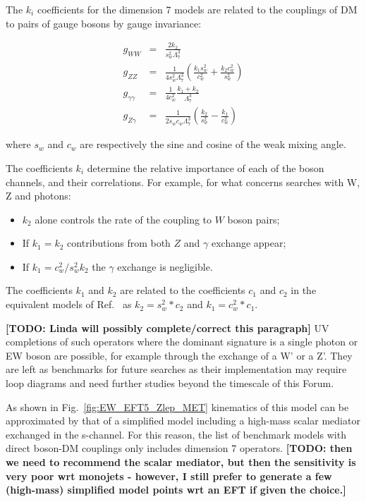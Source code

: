 The $k_i$ coefficients for the dimension 7 models are related to the couplings of DM to pairs of gauge 
bosons by gauge invariance: 

\begin{eqnarray}
g_{WW}&=&\frac{2k_2}{s_w^2 \Lambda_7^3} \\
g_{ZZ} &=& \frac{1}{4 s_w^2 \Lambda_7^3} \left(\frac{k_1 s_w^2}{c_w^2}+\frac{k_2 c_w^2}{s_w^2} \right) \\
g_{\gamma\gamma}&=&\frac{1}{4 c_w^2}\frac{k_1+k_2}{\Lambda_7^3} \\
g_{Z\gamma} &=& \frac{1}{2 s_w c_w \Lambda_7^3} \left(\frac{k_2}{s_w^2}-\frac{k_1}{c_w^2} \right)
\label{eq:prefactors}
\end{eqnarray}

where $s_w$ and $c_w$ are respectively the sine and cosine of the weak mixing angle. 

The coefficients $k_i$ determine the relative importance of each of the boson channels,
and their correlations. For example, for what concerns searches with W, Z and photons: 
\begin{itemize}
 \item $k_2$ alone controls the rate of the coupling to $W$ boson pairs;
 \item If $k_1 = k_2$ contributions from both $Z$ and $\gamma$ exchange appear;
 \item If $k_1 = c_w^2 / s_w^2 k_2$ the $\gamma$ exchange is negligible. 
\end{itemize}

The coefficients $k_1$ and $k_2$ are related to the coefficients $c_1$ and $c_2$ 
in the equivalent models of Ref.~\cite{Crivellin:2015wva} as $k_2 = s_w^2*c_2$ and $k_1=c_w^2 *c_1$.

\textbf{[TODO: Linda will possibly complete/correct this paragraph]} UV completions of 
such operators where the dominant signature is a single photon or EW boson are possible, 
for example through the exchange of a W' or a Z'. They are left as benchmarks for future searches as 
their implementation may require loop diagrams and need further studies beyond the timescale of this Forum. 

As shown in Fig.~\ref{fig:EW_EFT5_Zlep_MET}
kinematics of this model can be approximated by that of a simplified model including 
a high-mass scalar mediator exchanged in the s-channel. For this reason, 
the list of benchmark models with direct boson-DM couplings only includes dimension 7 operators. 
\textbf{[TODO: then we need to recommend the scalar mediator, 
but then the sensitivity is very poor wrt monojets - however, I still prefer
to generate a few (high-mass) simplified model points wrt an EFT if given the choice.]}

